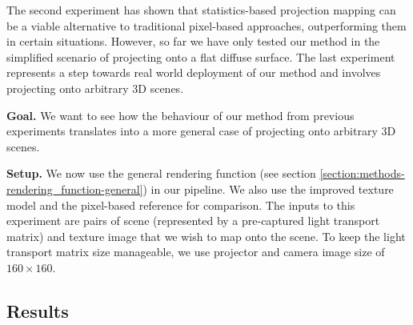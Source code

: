 The second experiment has shown that statistics-based projection mapping can be a viable alternative to traditional pixel-based approaches, outperforming them in certain situations. However, so far we have only tested our method in the simplified scenario of projecting onto a flat diffuse surface. The last experiment represents a step towards real world deployment of our method and involves projecting onto arbitrary 3D scenes.

\textbf{Goal.} We want to see how the behaviour of our method from previous experiments translates into a more general case of projecting onto arbitrary 3D scenes.

\textbf{Setup.} We now use the general rendering function (see section \ref{section:methods-rendering_function-general}) in our pipeline. We also use the improved texture model and the pixel-based reference for comparison. The inputs to this experiment are pairs of scene (represented by a pre-captured light transport matrix) and texture image that we wish to map onto the scene. To keep the light transport matrix size manageable, we use projector and camera image size of \(160 \times 160\).

\subsection{Results}
\label{section:results-experiments-03-results}

